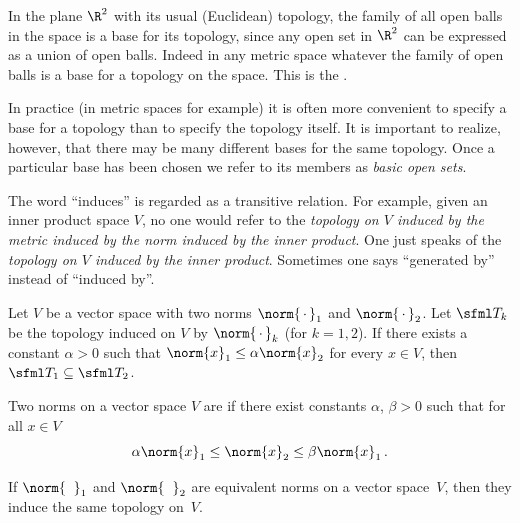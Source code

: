 \begin{exam}\label{xmpl_top_metric} In the plane $\R^2$ with its usual (Euclidean) topology, the family of
all open balls in the space is a base for its topology, since any open set in $\R^2$ can be expressed as a
union of open balls.  Indeed in any metric space whatever the family of open balls is a base for a topology
on the space.  This is the
.
\end{exam}

In practice (in metric spaces for example) it is often more convenient to specify a base for a topology than to specify
the topology itself.  It is important to realize, however, that there may be many
different bases for the same topology.  Once a particular base has been chosen we refer
to its members as
\emph{basic open sets}.

The word ``induces'' is regarded as a transitive relation.  For example, given an inner product space $V$, no one would
refer to the \emph{topology on $V$ induced by the metric induced by the norm induced by the inner product}.  One just speaks of
the \emph{topology on $V$ induced by the inner product}.  Sometimes one says ``generated by'' instead of ``induced by''.

\begin{prop} Let $V$ be a vector space with two norms $\norm{\,\cdot\,}_1$ and
$\norm{\,\cdot\,}_2$.  Let $\sfml T_k$ be the topology induced on $V$ by
$\norm{\,\cdot\,}_k$ (for $k = 1,2$). If there exists a constant $\alpha > 0$ such that
$\norm{x}_1 \le \alpha \norm{x}_2$ for every $x \in V$, then $\sfml T_1 \subseteq \sfml T_2$.
\end{prop}

\begin{defn} Two norms on a vector space $V$ are
 if there exist constants $\alpha$, $\beta > 0$ such that for all $x \in
V$
   \[ \alpha\norm{x}_1 \le \norm{x}_2 \le \beta \norm{x}_1\,. \]
\end{defn}

\begin{prop}\label{C023184} If $\norm{\hphantom{x}}_1$ and $\norm{\hphantom{x}}_2$
are equivalent norms on a vector space~$V$, then they induce the same topology on~$V$.
\end{prop}

